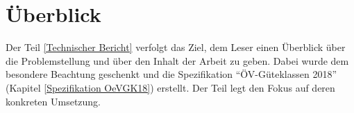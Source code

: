 
\section{Überblick}
\label{Überblick}

Der Teil \ref{Technischer Bericht}  verfolgt das Ziel, dem Leser einen Überblick über die Problemstellung und über den Inhalt der Arbeit zu geben.
Dabei wurde dem  besondere Beachtung geschenkt und die Spezifikation "`\acs{ÖV}-Güteklassen 2018"' (Kapitel \ref{Spezifikation OeVGK18}) erstellt.
Der Teil  legt den Fokus auf deren konkreten Umsetzung.